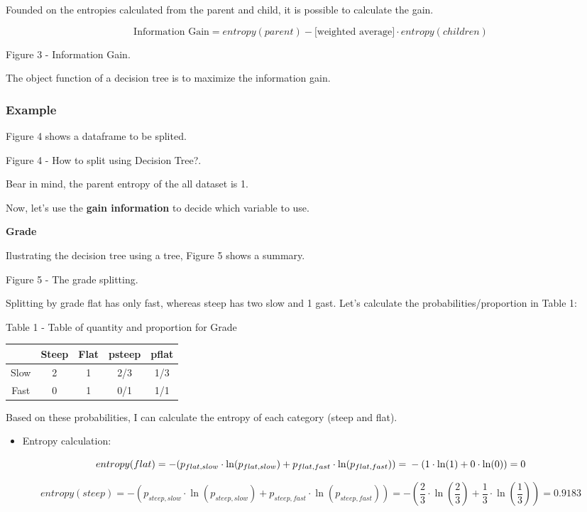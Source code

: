 \documentclass[]{book}
\providecommand{\tightlist}{%
  \setlength{\itemsep}{0pt}\setlength{\parskip}{0pt}}
\begin{document}
Founded on the entropies calculated from the parent and child, it is
possible to calculate the gain.

\[\text{Information Gain} = entropy(parent) - [\text{weighted average]} \cdot entropy(children)\]

Figure 3 - Information Gain.

The object function of a decision tree is to maximize the information
gain.

\subsubsection{Example}\label{example-1}

Figure 4 shows a dataframe to be splited.

Figure 4 - How to split using Decision Tree?.

Bear in mind, the parent entropy of the all dataset is 1.

Now, let's use the \textbf{gain information} to decide which variable to
use.

\textbf{Grade}

Ilustrating the decision tree using a tree, Figure 5 shows a summary.

Figure 5 - The grade splitting.

Splitting by grade flat has only fast, whereas steep has two slow and 1
gast. Let's calculate the probabilities/proportion in Table 1:

Table 1 - Table of quantity and proportion for Grade

\begin{longtable}[]{@{}ccccc@{}}
\toprule
& Steep & Flat & psteep & pflat\tabularnewline
\midrule
\endhead
Slow & 2 & 1 & 2/3 & 1/3\tabularnewline
Fast & 0 & 1 & 0/1 & 1/1\tabularnewline
\bottomrule
\end{longtable}

Based on these probabilities, I can calculate the entropy of each
category (steep and flat).

\begin{itemize}
\tightlist
\item
  Entropy calculation:
\end{itemize}

\[entropy(flat) = -(p_{flat,slow} \cdot \ln(p_{flat,slow}) + p_{flat,fast} \cdot \ln(p_{flat,fast})) = \\ -(1 \cdot \ln(1) + 0 \cdot \ln(0)) = 0 \]

\[entropy(steep) = -(p_{steep,slow} \cdot \ln(p_{steep,slow}) + p_{steep,fast} \cdot \ln(p_{steep,fast})) = -(\frac{2}{3} \cdot \ln(\frac{2}{3}) + \frac{1}{3} \cdot \ln(\frac{1}{3})) = 0.9183\]
\end{document}
